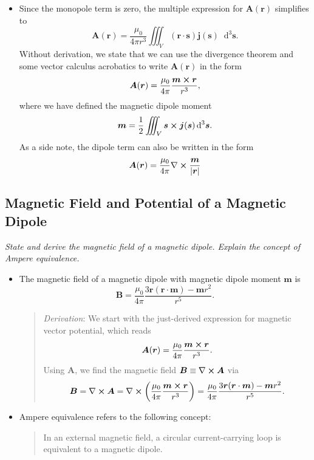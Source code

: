 \documentclass[11pt, a4paper]{article}
\newcommand{\diff}{\mathop{}\!\mathrm{d}} %
\renewcommand{\vec}[1]{\bm{#1}} %
\renewcommand{\r}{\vec{r}}
\newcommand{\B}{\vec{B}} %
\newcommand{\A}{\vec{A}} %
\newcommand{\mm}{\mu_{0}}  %
\newcommand{\m}{\vec{m}}  %
\renewcommand{\j}{\vec{j}}  %
\newcommand{\s}{\vec{s}}  %
\newcommand{\ds}{\diff^{3} \s}  %
\renewcommand{\curl}{\nabla \cross}
\begin{document}
\begin{itemize}
    \item Since the monopole term is zero, the multiple expression for $ \A(\r) $ simplifies to
	\begin{equation*}
		 \A(\r) = \frac{\mm}{4\pi r^{3}} \iiint_{V}(\r \cdot \s)\j(\s)\ds.
	\end{equation*}
    Without derivation, we state that we can use the divergence theorem and some vector calculus acrobatics to write $ \A(\r) $ in the form
	\begin{equation*}
		\A(\r) = \frac{\mm}{4\pi}\frac{\m \cross \r}{r^{3}},
	\end{equation*}
	where we have defined the magnetic dipole moment
	\begin{equation*}
		\m = \frac{1}{2}\iiint_{V} \s \cross \j(\s) \ds.
	\end{equation*}
	As a side note, the dipole term can also be written in the form
	\begin{equation*}
		\A(\r) =  \frac{\mm}{4\pi} \curl \frac{\m}{\abs{\r}}
	\end{equation*}
\end{itemize}


\subsection{Magnetic Field and Potential of a Magnetic Dipole}
\textit{State and derive the magnetic field of a magnetic dipole. Explain the concept of Ampere equivalence.}

\begin{itemize}
    \item The magnetic field of a magnetic dipole with magnetic dipole moment $ \m $ is
    \begin{equation*}
        \B = \frac{\mm}{4\pi} \frac{3 \r (\r \cdot \m) - \m r^{2}}{r^{5}}.
    \end{equation*}
    \begin{quote}
        \textit{Derivation}: We start with the just-derived expression for magnetic vector potential, which reads
	\begin{equation*}
		\A(\r) = \frac{\mm}{4\pi}\frac{\m \cross \r}{r^{3}}.
	\end{equation*}
	Using $ \A $, we find the magnetic field $ \B \equiv \curl \A $ via
	\begin{equation*}
		\B = \curl \A = \curl \left(\frac{\mm}{4\pi}\frac{\m \cross \r}{r^{3}}\right) = \frac{\mm}{4\pi} \frac{3\r(\r \cdot \m) - \m r^{2}}{r^{5}}.
	\end{equation*}
    \end{quote}
    
	\item Ampere equivalence refers to the following concept:
    \begin{quote}
        In an external magnetic field, a circular current-carrying loop is equivalent to a magnetic dipole.
    \end{quote}
\end{itemize}
\end{document}
